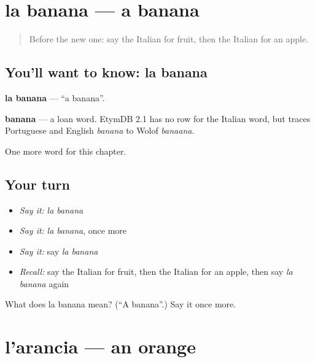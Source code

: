 \section[la banana]{la banana — a banana}

\label{lesson:IT-C52-banana}



\begin{quote}
Before the new one: say the Italian for fruit, then the Italian for an apple.
\end{quote}

\subsection*{You'll want to know: la banana}
\textbf{la banana} — \textquotedblleft{}a banana\textquotedblright{}.

\begin{cousinweb}
\textbf{banana} — a loan word. EtymDB 2.1 has no row for the Italian word, but traces Portuguese and English \emph{banana} to Wolof \emph{banaana}.
\end{cousinweb}

\begin{grammarlens}[title={What you've built}]
One more word for this chapter.
\end{grammarlens}

\subsection*{Your turn}
\begin{itemize}
\raggedright
  \item \emph{Say it:} \emph{la banana}
  \item \emph{Say it:} \emph{la banana}, once more
  \item \emph{Say it:} say \emph{la banana}
  \item \emph{Recall:} say the Italian for fruit, then the Italian for an apple, then say \emph{la banana} again
\end{itemize}

\begin{tcolorbox}[breakable,colback=teal!4,colframe=teal!35!black,title={Before you move on}]
What does la banana mean? (\textquotedblleft{}A banana\textquotedblright{}.) Say it once more.
\end{tcolorbox}
\section[l'arancia]{l'arancia — an orange}

